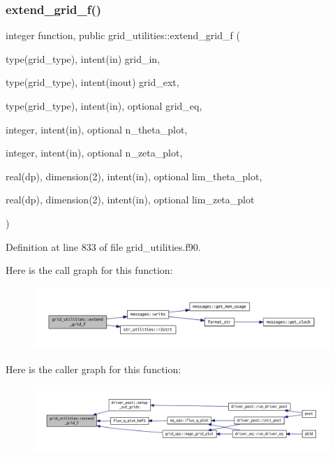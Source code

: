 \subsubsection{\texorpdfstring{extend\+\_\+grid\+\_\+f()}{extend\_grid\_f()}}
{\footnotesize\ttfamily integer function, public grid\+\_\+utilities\+::extend\+\_\+grid\+\_\+f (\begin{DoxyParamCaption}\item[{type(grid\+\_\+type), intent(in)}]{grid\+\_\+in,  }\item[{type(grid\+\_\+type), intent(inout)}]{grid\+\_\+ext,  }\item[{type(grid\+\_\+type), intent(in), optional}]{grid\+\_\+eq,  }\item[{integer, intent(in), optional}]{n\+\_\+theta\+\_\+plot,  }\item[{integer, intent(in), optional}]{n\+\_\+zeta\+\_\+plot,  }\item[{real(dp), dimension(2), intent(in), optional}]{lim\+\_\+theta\+\_\+plot,  }\item[{real(dp), dimension(2), intent(in), optional}]{lim\+\_\+zeta\+\_\+plot }\end{DoxyParamCaption})}



Definition at line 833 of file grid\+\_\+utilities.\+f90.

Here is the call graph for this function\+:
\nopagebreak
\begin{figure}[H]
\begin{center}
\leavevmode
\includegraphics[width=350pt]{namespacegrid__utilities_a414a1a11924bc935afca3a89fc31f2f5_cgraph}
\end{center}
\end{figure}
Here is the caller graph for this function\+:
\nopagebreak
\begin{figure}[H]
\begin{center}
\leavevmode
\includegraphics[width=350pt]{namespacegrid__utilities_a414a1a11924bc935afca3a89fc31f2f5_icgraph}
\end{center}
\end{figure}
\mbox{\label{namespacegrid__utilities_ae08e1ff213071c9d411a9b9c76035e1e}} 

